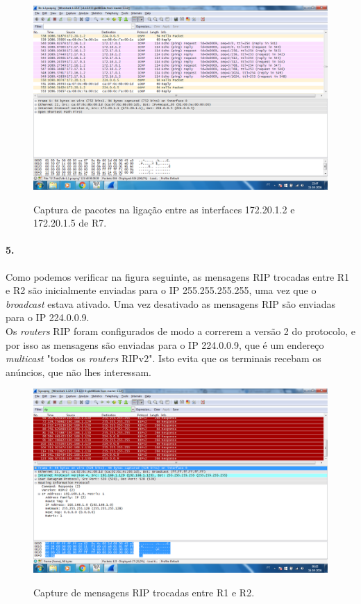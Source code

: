 \begin{figure}[h]
\centering
\includegraphics[width=1\textwidth, height=0.45\textheight]{4b_.png}
\label{fig:captura}
\caption{Captura de pacotes na ligação entre as interfaces 172.20.1.2 e 172.20.1.5 de \textsf{R7}.}
\end{figure}

\paragraph{5.}
Como podemos verificar na figura seguinte, as mensagens RIP trocadas entre \textsf{R1} e \textsf{R2} são inicialmente enviadas para o IP 255.255.255.255, uma vez que o \emph{broadcast} estava ativado. Uma vez desativado as mensagens RIP são enviadas para o IP 224.0.0.9.\\
Os \emph{routers} RIP foram configurados de modo a correrem a versão 2 do protocolo, e por isso as mensagens são enviadas para o IP 224.0.0.9, que é um endereço \emph{multicast} "todos os \emph{routers} RIPv2".
Isto evita que os terminais recebam os anúncios, que não lhes interessam.

\begin{figure}[h]
\centering
\includegraphics[width=1\textwidth, height=0.45\textheight]{5.png}
\label{fig:captura}
\caption{Capture de mensagens RIP trocadas entre \textsf{R1} e \textsf{R2}.}
\end{figure}

